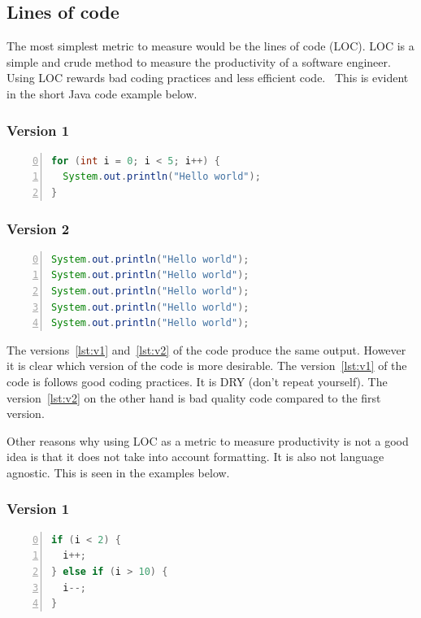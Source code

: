 \documentclass{article}
\begin{document}
\subsection{Lines of code}
The most simplest metric to measure would be the lines of code (LOC). LOC is a
simple and crude method to measure the productivity of a software engineer.
Using LOC rewards bad coding practices and less efficient
code.~\cite{fenton1999software} This is evident in the short Java code example
below.

\subsubsection{Version 1}
\begin{lstlisting}[language=Java,frame=single,firstnumber=0,numbers=left,label={lst:v1}]
for (int i = 0; i < 5; i++) {
  System.out.println("Hello world");
}
\end{lstlisting}

\subsubsection{Version 2}
\begin{lstlisting}[language=Java,frame=single,firstnumber=0,numbers=left,label={lst:v2}]
System.out.println("Hello world");
System.out.println("Hello world");
System.out.println("Hello world");
System.out.println("Hello world");
System.out.println("Hello world");
\end{lstlisting}

The versions~\ref{lst:v1} and~\ref{lst:v2} of the code produce the same output.
However it is clear which version of the code is more desirable. The
version~\ref{lst:v1} of the code is follows good coding practices. It is DRY
(don't repeat yourself). The version~\ref{lst:v2} on the other hand is bad
quality code compared to the first version.

Other reasons why using LOC as a metric to measure productivity is not a good
idea is that it does not take into account formatting. It is also not language
agnostic. This is seen in the examples below.

\subsubsection{Version 1}
\begin{lstlisting}[language=Java,frame=single,firstnumber=0,numbers=left,label={lst:fmtv1}]
if (i < 2) {
  i++;
} else if (i > 10) {
  i--;
}
\end{lstlisting}
\end{document}
